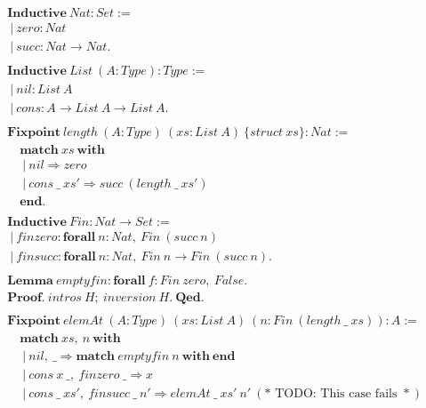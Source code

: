 \begin{align*}
&\mathbf{Inductive}\ Nat : Set :=\\
&\ |\ zero : Nat\\
&\ |\ succ : Nat \rightarrow Nat.\\
\\
&\mathbf{Inductive}\ List\ (A : Type) : Type :=\\
&\ |\ nil : List\ A\\
&\ |\ cons : A \rightarrow List\ A \rightarrow List\ A.\\
\\
&\mathbf{Fixpoint}\ length\ (A : Type)\ (xs : List\ A)\ \{struct\ xs\} : Nat :=\\
&\quad\mathbf{match}\ xs\ \mathbf{with}\\
&\quad\ |\ nil \Rightarrow zero\\
&\quad\ |\ cons\ \_\ xs' \Rightarrow succ\ (length\ \_\ xs')\\
&\quad\mathbf{end}.\\
\\
&\mathbf{Inductive}\ Fin : Nat \rightarrow Set :=\\
&\ |\ finzero : \mathbf{forall}\ n : Nat,\ Fin\ (succ\ n)\\
&\ |\ finsucc : \mathbf{forall}\ n : Nat,\ Fin\ n \rightarrow Fin\ (succ\ n).\\
\\
&\mathbf{Lemma}\ emptyfin : \mathbf{forall}\ f : Fin\ zero,\ False.\\
&\mathbf{Proof}.\ intros\ H;\ inversion\ H.\ \mathbf{Qed}.\\
\\
&\mathbf{Fixpoint}\ elemAt\ (A : Type)\ (xs : List\ A)\ (n : Fin\ (length\ \_\ xs)) : A :=\\
&\quad\mathbf{match}\ xs,\ n\ \mathbf{with}\\
&\quad\ |\ nil,\ \_ \Rightarrow \mathbf{match}\ emptyfin\ n\ \mathbf{with\ end}\\
&\quad\ |\ cons\ x\ \_,\ finzero\ \_ \Rightarrow x\\
&\quad\ |\ cons\ \_\ xs',\ finsucc\ \_\ n' \Rightarrow elemAt\ \_\ xs'\ n'
\ (*\text{ TODO: This case fails }*)
\end{align*}

